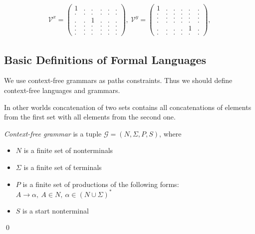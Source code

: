 \begin{align*}
\mathcal{V}^x =
\begin{pmatrix}
    1 & . & . & . & . & . \\
    . & . & . & . & . & . \\
    . & . & 1 & . & . & . \\
    . & . & . & . & . & . \\ 
    . & . & . & . & . & . \\ 
    . & . & . & . & . & .
\end{pmatrix},~ 
\mathcal{V}^y =
\begin{pmatrix}
    1 & . & . & . & . & . \\
    . & . & . & . & . & . \\
    . & . & . & . & . & . \\
    . & . & . & . & . & . \\ 
    . & . & . & . & 1 & . \\ 
    . & . & . & . & . & .
\end{pmatrix},  \label{eq:boolean_decomposition_of_graph}
\end{align*}


\subsection{Basic Definitions of Formal Languages}
We use context-free grammars as paths constraints. Thus we should define context-free languages and grammars.



In other worlds concatenation of two sets contains all concatenations of elements from the first set with all elements from the second one.

\begin{definition}\emph{Context-free grammar} is a tuple $\mathcal{G}=(N, \Sigma, P, S)$, where 
\begin{itemize}
    \item $N$ is a finite set of nonterminals
    \item $\Sigma$ is a finite set of terminals
    \item $P$ is a finite set of productions of the following forms: $A \to \alpha, ~A \in N,~ \alpha \in (N \cup \Sigma)^*$
    \item $S$ is a start nonterminal
\end{itemize} \qed
\end{definition}


